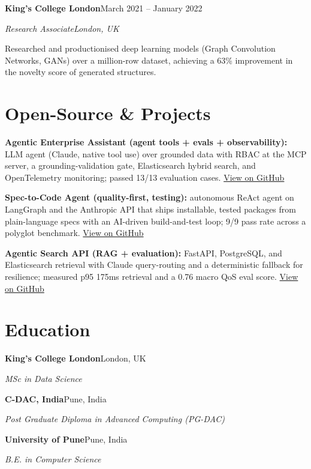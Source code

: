 \documentclass[10pt,a4paper]{article}
\newcommand{\entry}[4]{%
  {\color{company}\bfseries #1}\hfill {\color{muted}#2}\par
  \vspace{1pt}
  {\itshape #3}\hfill {\color{muted}\itshape #4}\par
  \vspace{3pt}%
}
\begin{document}
\entry{King's College London}{March 2021 -- January 2022}{Research Associate}{London, UK}
\begin{tight}
  \item Researched and productionised deep learning models (Graph Convolution Networks, GANs) over a million-row dataset, achieving a 63\% improvement in the novelty score of generated structures.
\end{tight}

\section{Open-Source \& Projects}
\begin{tight}
  \item \textbf{Agentic Enterprise Assistant (agent tools + evals + observability):} LLM agent (Claude, native tool use) over grounded data with RBAC at the MCP server, a grounding-validation gate, Elasticsearch hybrid search, and OpenTelemetry monitoring; passed 13/13 evaluation cases. \href{https://github.com/abhijeetscode/Agentic-Enterprise-Assistant}{View on GitHub}
  \item \textbf{Spec-to-Code Agent (quality-first, testing):} autonomous ReAct agent on LangGraph and the Anthropic API that ships installable, tested packages from plain-language specs with an AI-driven build-and-test loop; 9/9 pass rate across a polyglot benchmark. \href{https://github.com/abhijeetscode/Spec-to-Code-Agent}{View on GitHub}
  \item \textbf{Agentic Search API (RAG + evaluation):} FastAPI, PostgreSQL, and Elasticsearch retrieval with Claude query-routing and a deterministic fallback for resilience; measured p95 175ms retrieval and a 0.76 macro QoS eval score. \href{https://github.com/abhijeetscode/search-agent}{View on GitHub}
\end{tight}

\section{Education}
{\color{company}\bfseries King's College London}\hfill {\color{muted}London, UK}\par
{\itshape MSc in Data Science}\par\vspace{2pt}
{\color{company}\bfseries C-DAC, India}\hfill {\color{muted}Pune, India}\par
{\itshape Post Graduate Diploma in Advanced Computing (PG-DAC)}\par\vspace{2pt}
{\color{company}\bfseries University of Pune}\hfill {\color{muted}Pune, India}\par
{\itshape B.E. in Computer Science}\par
\end{document}
